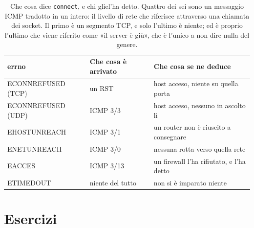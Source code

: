 \begin{table}[H]
\centering
\begin{tabular}{>{\ttfamily}l l l}
\toprule
\normalfont\textbf{errno} & \textbf{Che cosa è arrivato} & \textbf{Che cosa se ne deduce} \\
\midrule
ECONNREFUSED \normalfont(TCP) & un RST              & host acceso, niente su quella porta \\
ECONNREFUSED \normalfont(UDP) & ICMP 3/3            & host acceso, nessuno in ascolto lì \\
EHOSTUNREACH                  & ICMP 3/1            & un router non è riuscito a consegnare \\
ENETUNREACH                   & ICMP 3/0            & nessuna rotta verso quella rete \\
EACCES                        & ICMP 3/13           & un firewall l'ha rifiutato, e l'ha detto \\
ETIMEDOUT                     & niente del tutto    & non si è imparato niente \\
\bottomrule
\end{tabular}
\caption{Che cosa dice \texttt{connect}, e chi gliel'ha detto. Quattro dei sei sono un messaggio ICMP tradotto in un intero:
         il livello di rete che riferisce attraverso una chiamata dei socket. Il primo è un segmento TCP, e solo l'ultimo è
         niente; ed è proprio l'ultimo che viene riferito come «il server è giù», che è l'unico a non dire nulla del genere.}
\end{table}

\section{Esercizi}


